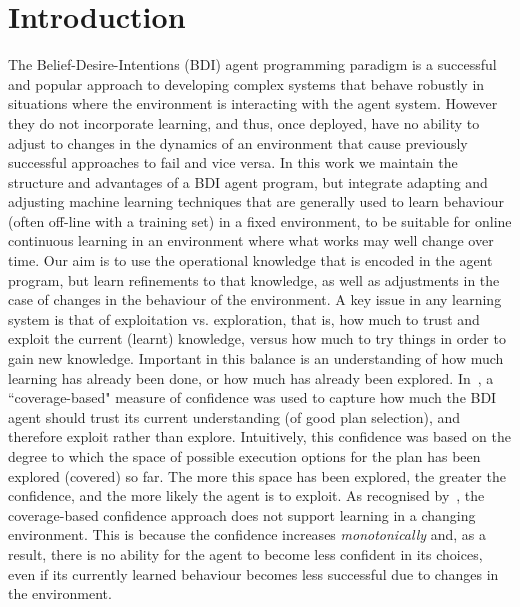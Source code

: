 \section{Introduction}\label{sec:introduction}


The Belief-Desire-Intentions (BDI) agent programming paradigm
\cite{WooldridgeBook,BusettaRHL:AL99-JACK,Pokahr:EXP03-JADEX,jasonbook} is a
successful and popular approach to developing complex systems that
behave robustly in situations where the environment is
interacting with the agent system.
However they do not incorporate learning, and thus, once deployed,
have no ability to adjust to changes in the dynamics of an environment
that cause previously successful approaches to fail and vice versa.
In this work we maintain the structure and advantages of a BDI agent
program, but integrate adapting and adjusting machine
learning techniques that are generally used to learn behaviour (often off-line with a training set) in a
fixed environment, to be
suitable for online continuous learning in an environment where what
works may well change over time.
Our aim is to use the operational knowledge that is encoded in the
agent program, but learn refinements to that knowledge, as well as adjustments in the case of changes in the behaviour of the
environment. 
A key issue in any learning system is that of exploitation
vs. exploration, that is, how much to trust and exploit the current
(learnt) knowledge, versus how much to try things in order to gain new
knowledge. Important in this balance is an understanding of how much
learning has already been done, or how much has already been
explored. In~\cite{singh10:extending,singh10:learning}, a
``coverage-based" measure of confidence was used to capture how much
the BDI agent should trust its current understanding (of good plan
selection), and therefore exploit rather than explore. Intuitively,
this confidence was based on the degree to which the space of possible
execution options for the plan has been explored (covered) so
far. The more this space has been explored, the
greater the confidence, and the more likely the agent is
to exploit.   
%
As recognised by~\cite{singh10:learning}, the coverage-based
confidence approach does not support learning in a changing
environment. This is because the confidence increases
\emph{monotonically} and, as a result, there is no ability for the
agent to become less confident in its choices, even if its currently
learned behaviour becomes less successful due to changes in the
environment. 

